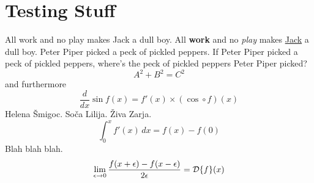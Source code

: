 \documentclass{article}
\begin{document}
\section{Testing Stuff}
All work and no play makes Jack a dull boy.
All \textbf{work} and no \emph{play} makes \underline{Jack} a dull boy.
Peter Piper picked a peck of pickled peppers.
If Peter Piper picked a peck of pickled peppers, where's the peck of
pickled peppers Peter Piper picked?
\begin{equation}
  A^2 + B^2 = C^2
\end{equation}
and furthermore
\begin{equation}
  \frac{d}{dx} \sin f(x) = f'(x) \times (\cos \circ f)(x)
\end{equation}
Helena \v{S}migoc.
So\v{c}a Lilija.
\v{Z}iva Zarja.
\begin{equation}
  \int_0^x f'(x) \, dx = f(x) - f(0)
\end{equation}
Blah blah blah.
\begin{equation}
  \lim_{\epsilon \rightarrow 0} \frac{f(x+\epsilon) -
    f(x-\epsilon)}{2\epsilon} = {\cal D}\{f\}(x)
\end{equation}
\end{document}
